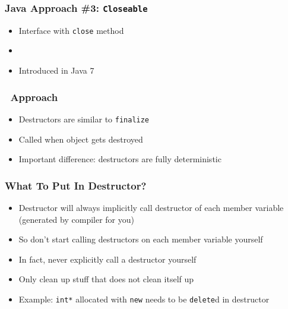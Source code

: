 \begin{frame}
  \frametitle{Java Approach \#3: {\tt Closeable}}
  \begin{itemize}
    \item Interface with {\tt close} method
    \item {}
    \item Introduced in Java 7
  \end{itemize}
  \vskip5mm
\end{frame}

\begin{frame}
  \frametitle{\cpp\ Approach}
  \begin{itemize}
    \item Destructors are similar to {\tt finalize}
    \item Called when object gets destroyed
    \item Important difference: destructors are fully deterministic
  \end{itemize}
  \vskip5mm
  \begin{overprint}



  \end{overprint}
\end{frame}

\begin{frame}
  \frametitle{What To Put In Destructor?}
  \begin{itemize}
    \item Destructor will always implicitly call destructor of each member variable
          (generated by compiler for you)
    \item So don't start calling destructors on each member variable yourself
    \item In fact, never explicitly call a destructor yourself
    \item Only clean up stuff that does not clean itself up
    \item Example: {\tt int*} allocated with {\tt new} needs to be {\tt delete}d in destructor
  \end{itemize}
\end{frame}


